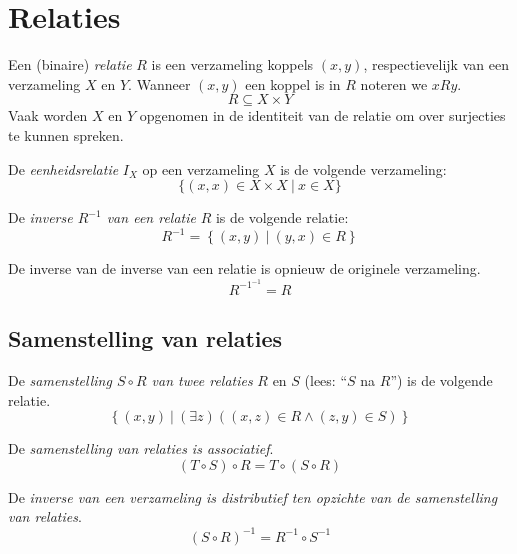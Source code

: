 \documentclass[main.tex]{subfiles}
\begin{document}
\chapter{Relaties}
\label{cha:relaties}

\begin{de}
  Een (binaire) \emph{relatie} $R$ is een verzameling koppels $(x,y)$, respectievelijk van een verzameling $X$ en $Y$. 
  Wanneer $(x,y)$ een koppel is in $R$ noteren we $x R y$.
  \[ R \subseteq X \times Y \]
  Vaak worden $X$ en $Y$ opgenomen in de identiteit van de relatie om over surjecties te kunnen spreken.
\end{de}

\begin{de}
  De \emph{eenheidsrelatie} $I_{X}$ op een verzameling $X$ is de volgende verzameling:
  \[ \{(x,x) \in X \times X\ |\ x \in X \} \]
\end{de}

\begin{de}
  De \emph{inverse $R^{-1}$ van een relatie} $R$ is de volgende relatie:
  \[ R^{-1} = \left\{ (x,y)\ |\ (y,x) \in R \right\} \]
\end{de}

\begin{st}
  De inverse van de inverse van een relatie is opnieuw de originele verzameling.
  \[ R^{-1^{-1}} = R \]
\end{st}

\section{Samenstelling van relaties}
\label{sec:samenst-van-relat}

\begin{de}
  De \emph{samenstelling $S \circ R$ van twee relaties} $R$ en $S$ (lees: ``$S$ na $R$'') is de volgende relatie.
  \[ \left\{ (x,y) \ |\ (\exists z) ((x,z) \in R \wedge (z,y) \in S) \right\} \]
\end{de}

\begin{st}
  \label{st:samenstelling-relaties-associatief}
  De \emph{samenstelling van relaties is associatief}.
  \[ (T \circ S) \circ R = T \circ (S \circ R) \]
\end{st}

\begin{st}
  De \emph{inverse van een verzameling is distributief ten opzichte van de samenstelling van relaties}.
  \[ (S \circ R)^{-1} = R^{-1} \circ S^{-1} \]
\end{st}
\end{document}
